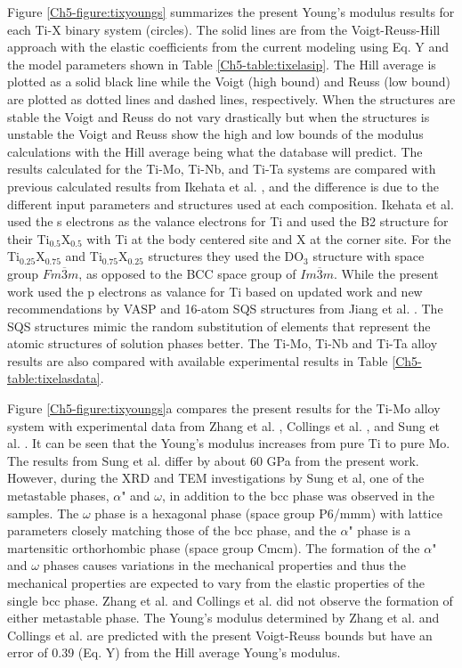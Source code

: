 Figure \ref{Ch5-figure:tixyoungs} summarizes the present Young's modulus results for each Ti-X binary system (circles). The solid lines are from the Voigt-Reuss-Hill approach with the elastic coefficients from the current modeling using Eq. Y and the model parameters shown in Table \ref{Ch5-table:tixelasip}. The Hill average is plotted as a solid black line while the Voigt (high bound) and Reuss (low bound) are plotted as dotted lines and dashed lines, respectively. When the structures are stable the Voigt and Reuss do not vary drastically but when the structures is unstable the Voigt and Reuss show the high and low bounds of the modulus calculations with the Hill average being what the database will predict. The results calculated for the Ti-Mo, Ti-Nb, and Ti-Ta systems are compared with previous calculated results from Ikehata et al. \cite{Ikehata2004}, and the difference is due to the different input parameters and structures used at each composition. Ikehata et al. used the s electrons as the valance electrons for Ti and used the B2 structure for their Ti$_{0.5}$X$_{0.5}$ with Ti at the body centered site and X at the corner site. For the Ti$_{0.25}$X$_{0.75}$ and Ti$_{0.75}$X$_{0.25}$ structures they used the DO$_3$ structure with space group $Fm\overline{3}m$, as opposed to the BCC space group of $Im\overline{3}m$. While the present work used the p electrons as valance for Ti based on updated work and new recommendations by VASP and 16-atom SQS structures from Jiang et al. \cite{Jiang2004}. The SQS structures mimic the random substitution of elements that represent the atomic structures of solution phases better. The Ti-Mo, Ti-Nb and Ti-Ta alloy results are also compared with available experimental results \cite{Zhang2015,Boyer1994,Sung2015,Ozaki2004,Fedotov1985,Zhou2009a,Zhou2004a} in Table \ref{Ch5-table:tixelasdata}. 

Figure \ref{Ch5-figure:tixyoungs}a compares the present results for the Ti-Mo alloy system with experimental data from Zhang et al. \cite{Zhang2015}, Collings et al. \cite{Boyer1994}, and Sung et al. \cite{Sung2015}. It can be seen that the Young's modulus increases from pure Ti to pure Mo. The results from Sung et al. \cite{Sung2015} differ by about 60 GPa from the present work. However, during the XRD and TEM investigations by Sung et al, one of the metastable phases, $\alpha$" and $\omega$, in addition to the bcc phase was observed in the samples. The $\omega$ phase is a hexagonal phase (space group P6/mmm) with lattice parameters closely matching those of the bcc phase, and the $\alpha$" phase is a martensitic orthorhombic phase (space group Cmcm). The formation of the $\alpha$" and $\omega$ phases causes variations in the mechanical properties and thus the mechanical properties are expected to vary from the elastic properties of the single bcc phase. Zhang et al. \cite{Zhang2015} and Collings et al. \cite{Boyer1994} did not observe the formation of either metastable phase. The Young's modulus determined by Zhang et al. and Collings et al. are predicted with the present Voigt-Reuss bounds but have an error of 0.39 (Eq. Y) from the Hill average Young's modulus. 

